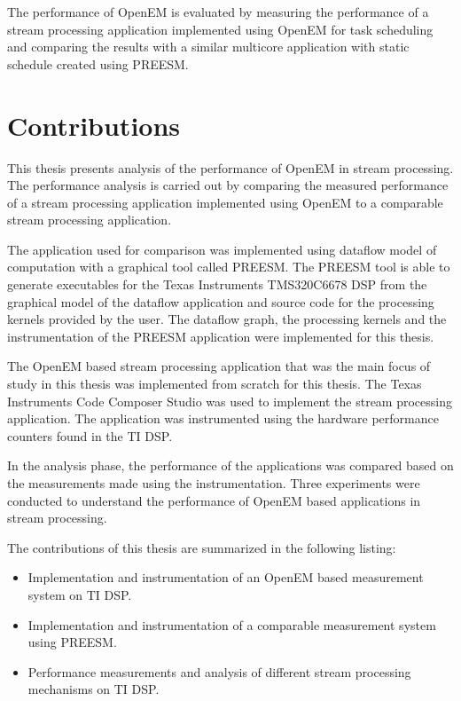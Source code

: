 The performance of OpenEM is evaluated by measuring the performance of a stream processing application implemented using OpenEM for task scheduling and comparing the results with a similar multicore application with static schedule created using PREESM.

\section{Contributions}
\label{section:contributions}
This thesis presents analysis of the performance of OpenEM in stream processing. The performance analysis is carried out by comparing the measured performance of a stream processing application implemented using OpenEM to a comparable stream processing application.

The application used for comparison was implemented using dataflow model of computation with a graphical tool called PREESM. The PREESM tool is able to generate executables for the Texas Instruments TMS320C6678 DSP from the graphical model of the dataflow application and source code for the processing kernels provided by the user. The dataflow graph, the processing kernels and the instrumentation of the PREESM application were implemented for this thesis.

The OpenEM based stream processing application that was the main focus of study in this thesis was implemented from scratch for this thesis. The Texas Instruments Code Composer Studio was used to implement the stream processing application. The application was instrumented using the hardware performance counters found in the TI DSP.

In the analysis phase, the performance of the applications was compared based on the measurements made using the instrumentation. Three experiments were conducted to understand the performance of OpenEM based applications in stream processing.

The contributions of this thesis are summarized in the following listing:
\begin{itemize}
    \item Implementation and instrumentation of an OpenEM based measurement system on TI DSP.
    \item Implementation and instrumentation of a comparable measurement system using PREESM.
    \item Performance measurements and analysis of different stream processing mechanisms on TI DSP.
\end{itemize}

